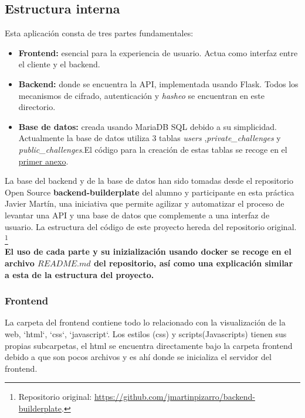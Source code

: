 \documentclass[a4paper,11pt]{article}
\begin{document}
\subsection{Estructura interna}

Esta aplicación consta de tres partes fundamentales:
\begin{itemize}
    \item \textbf{Frontend:} esencial para la experiencia de usuario. Actua como interfaz entre el cliente y el backend.
    \item \textbf{Backend:} donde se encuentra la API, implementada usando
        Flask. Todos los mecanismos de cifrado, autenticación y \textit{hasheo} se encuentran en este directorio.
    \item \textbf{Base de datos:} creada usando MariaDB SQL debido a su
        simplicidad. Actualmente la base de datos utiliza 3 tablas
        \textit{users} ,\textit{private\_challenges} y
        \textit{public\_challenges}.El código para la creación de estas tablas se recoge en el
        \hyperref[sec:TablasSQL]{primer anexo}. 
\end{itemize}
La base del backend y de la base de datos han sido tomadas desde el repositorio
Open Source \textbf{backend-builderplate} del alumno y participante en esta
práctica Javier Martín, una iniciativa que permite agilizar y automatizar el
proceso de levantar una API y una base de datos que complemente a una interfaz
de usuario. La estructura del código de este proyecto hereda del repositorio original.%
\footnote{Repositorio original:
\url{https://github.com/jmartinpizarro/backend-builderplate}.}\\

\textbf{El uso de cada parte y su inizialización usando docker se recoge en el
archivo $README.md$ del repositorio, así como una explicación similar a esta de
la estructura del proyecto.}\\

\subsubsection{Frontend}
La carpeta del frontend contiene todo lo relacionado con la visualización de la
web, `html`, `css`, `javascript`. Los estilos (css) y scripts(Javascripts)
tienen sus propias subcarpetas, el html se encuentra directamente bajo la
carpeta frontend debido a que son pocos archivos y es ahí donde se inicializa el
servidor del frontend. \\
\end{document}
